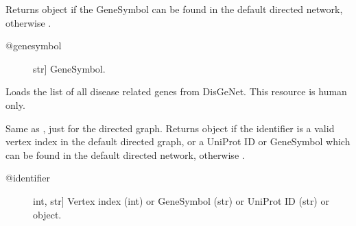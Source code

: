 \documentclass[letterpaper,10pt,english]{sphinxmanual}
\begin{document}
\begin{fulllineitems}

\begin{fulllineitems}
\label{\detokenize{main:pypath.main.PyPath.dgs}}
Returns  object if the GeneSymbol
can be found in the default directed network,
otherwise .
\begin{description}
\item[{@genesymbol}] \leavevmode{[}str{]}
GeneSymbol.

\end{description}

\end{fulllineitems}


\begin{fulllineitems}
\label{\detokenize{main:pypath.main.PyPath.dgss}}
\end{fulllineitems}


\begin{fulllineitems}
\label{\detokenize{main:pypath.main.PyPath.disease_genes_list}}
Loads the list of all disease related genes from DisGeNet. This
resource is human only.

\end{fulllineitems}


\begin{fulllineitems}
\label{\detokenize{main:pypath.main.PyPath.dneighbors}}
\end{fulllineitems}


\begin{fulllineitems}
\label{\detokenize{main:pypath.main.PyPath.dp}}
Same as , just for the directed graph.
Returns  object if the identifier
is a valid vertex index in the default directed graph,
or a UniProt ID or GeneSymbol which can be found in the
default directed network, otherwise .
\begin{description}
\item[{@identifier}] \leavevmode{[}int, str{]}
Vertex index (int) or GeneSymbol (str) or UniProt ID (str) or
 object.


\end{description}
\end{fulllineitems}
\end{fulllineitems}
\end{document}
